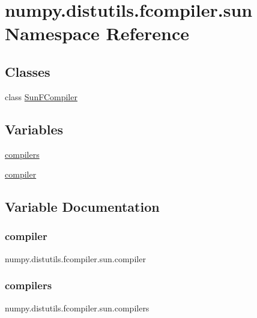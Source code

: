 \hypertarget{namespacenumpy_1_1distutils_1_1fcompiler_1_1sun}{}\section{numpy.\+distutils.\+fcompiler.\+sun Namespace Reference}
\label{namespacenumpy_1_1distutils_1_1fcompiler_1_1sun}
\subsection*{Classes}
\begin{DoxyCompactItemize}
\item 
class \hyperlink{classnumpy_1_1distutils_1_1fcompiler_1_1sun_1_1SunFCompiler}{Sun\+F\+Compiler}
\end{DoxyCompactItemize}
\subsection*{Variables}
\begin{DoxyCompactItemize}
\item 
\hyperlink{namespacenumpy_1_1distutils_1_1fcompiler_1_1sun_a0f664a074550d7762fdc415400b293d5}{compilers}
\item 
\hyperlink{namespacenumpy_1_1distutils_1_1fcompiler_1_1sun_a919140927410020906fdc650ea306f97}{compiler}
\end{DoxyCompactItemize}


\subsection{Variable Documentation}
\mbox{\label{namespacenumpy_1_1distutils_1_1fcompiler_1_1sun_a919140927410020906fdc650ea306f97}} 
\subsubsection{\texorpdfstring{compiler}{compiler}}
{\footnotesize\ttfamily numpy.\+distutils.\+fcompiler.\+sun.\+compiler}

\mbox{\label{namespacenumpy_1_1distutils_1_1fcompiler_1_1sun_a0f664a074550d7762fdc415400b293d5}} 
\subsubsection{\texorpdfstring{compilers}{compilers}}
{\footnotesize\ttfamily numpy.\+distutils.\+fcompiler.\+sun.\+compilers}

